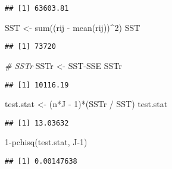 \documentclass[
]{book}
\newenvironment{Shaded}{\begin{snugshade}}{\end{snugshade}}
\newcommand{\CommentTok}[1]{\textcolor[rgb]{0.56,0.35,0.01}{\textit{#1}}}
\newcommand{\DecValTok}[1]{\textcolor[rgb]{0.00,0.00,0.81}{#1}}
\newcommand{\FunctionTok}[1]{\textcolor[rgb]{0.00,0.00,0.00}{#1}}
\newcommand{\NormalTok}[1]{#1}
\newcommand{\OtherTok}[1]{\textcolor[rgb]{0.56,0.35,0.01}{#1}}
\newcommand{\SpecialCharTok}[1]{\textcolor[rgb]{0.00,0.00,0.00}{#1}}
\begin{document}
\begin{verbatim}
## [1] 63603.81
\end{verbatim}

\begin{Shaded}
\begin{Highlighting}[]
\NormalTok{SST }\OtherTok{\textless{}{-}} \FunctionTok{sum}\NormalTok{((rij }\SpecialCharTok{{-}} \FunctionTok{mean}\NormalTok{(rij))}\SpecialCharTok{\^{}}\DecValTok{2}\NormalTok{)}
\NormalTok{SST}
\end{Highlighting}
\end{Shaded}

\begin{verbatim}
## [1] 73720
\end{verbatim}

\begin{Shaded}
\begin{Highlighting}[]
\CommentTok{\# SSTr}
\NormalTok{SSTr }\OtherTok{\textless{}{-}}\NormalTok{ SST}\SpecialCharTok{{-}}\NormalTok{SSE}
\NormalTok{SSTr}
\end{Highlighting}
\end{Shaded}

\begin{verbatim}
## [1] 10116.19
\end{verbatim}

\begin{Shaded}
\begin{Highlighting}[]
\NormalTok{test.stat }\OtherTok{\textless{}{-}}\NormalTok{ (n}\SpecialCharTok{*}\NormalTok{J }\SpecialCharTok{{-}} \DecValTok{1}\NormalTok{)}\SpecialCharTok{*}\NormalTok{(SSTr }\SpecialCharTok{/}\NormalTok{ SST)}
\NormalTok{test.stat}
\end{Highlighting}
\end{Shaded}

\begin{verbatim}
## [1] 13.03632
\end{verbatim}

\begin{Shaded}
\begin{Highlighting}[]
\DecValTok{1}\SpecialCharTok{{-}}\FunctionTok{pchisq}\NormalTok{(test.stat, J}\DecValTok{{-}1}\NormalTok{)}
\end{Highlighting}
\end{Shaded}

\begin{verbatim}
## [1] 0.00147638
\end{verbatim}
\end{document}
